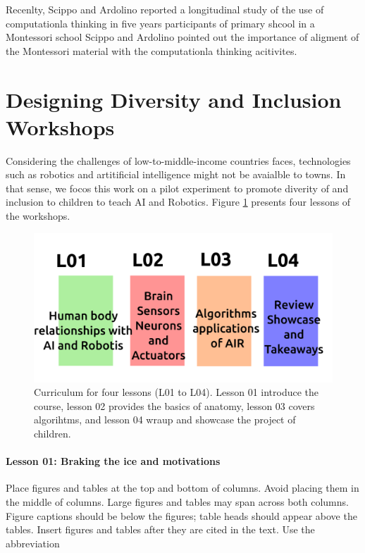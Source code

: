 \documentclass[conference]{IEEEtran}
\begin{document}
Recenlty, Scippo and Ardolino reported a longitudinal study of the use of computationla thinking in five years participants of primary shcool in a Montessori school \cite{ScippoArdolino2021}
Scippo and Ardolino pointed out the importance of aligment of the Montessori material with the computationla thinking acitivites. 

\section{Designing Diversity and Inclusion Workshops}
Considering the challenges of low-to-middle-income countries faces, technologies such as robotics and artitificial intelligence might not be avaialble to towns. 
In that sense, we focos this work on a pilot experiment to promote diverity of and inclusion to children to teach AI and Robotics. 
Figure \ref{fig:curriculum} presents four lessons of the workshops.
\begin{figure}[htbp]
    \centerline{\includegraphics[width=\linewidth]{curriculum-design/versions/drawing-v00.png}}
    \caption{Curriculum for four lessons (L01 to L04). 
    Lesson 01 introduce the course, 
    lesson 02 provides the basics of anatomy, 
    lesson 03 covers algorihtms, and 
    lesson 04 wraup and showcase the project of children.
    }
    \label{fig:curriculum}
\end{figure}

\paragraph{Lesson 01: Braking the ice and motivations} 
Place figures and tables at the top and bottom of columns. Avoid placing them in the middle of columns. 
Large figures and tables may span across both columns. Figure captions should be below the figures; table heads should appear above the tables. 
Insert figures and tables after they are cited in the text. Use the abbreviation 
\end{document}
